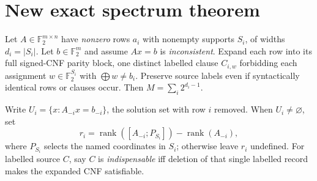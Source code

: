 \documentclass[11pt]{article}
\begin{document}
\section*{New exact spectrum theorem}
Let $A\in\mathbb F_2^{m\times n}$ have \emph{nonzero} rows $a_i$ with nonempty supports $S_i$, of widths $d_i=|S_i|$. Let $b\in\mathbb F_2^m$ and assume $Ax=b$ is \emph{inconsistent}. Expand each row into its full signed-CNF parity block, one distinct labelled clause $C_{i,w}$ forbidding each assignment $w\in\mathbb F_2^{S_i}$ with $\bigoplus w\ne b_i$. Preserve source labels even if syntactically identical rows or clauses occur. Then $M=\sum_i2^{d_i-1}$.

Write $U_i=\{x:A_{-i}x=b_{-i}\}$, the solution set with row $i$ removed. When $U_i\ne\varnothing$, set
\[
r_i=\operatorname{rank}([A_{-i};P_{S_i}])-\operatorname{rank}(A_{-i}),
\]
where $P_{S_i}$ selects the named coordinates in $S_i$; otherwise leave $r_i$ undefined. For labelled source $C$, say $C$ is \emph{indispensable} iff deletion of that single labelled record makes the expanded CNF satisfiable.
\end{document}
